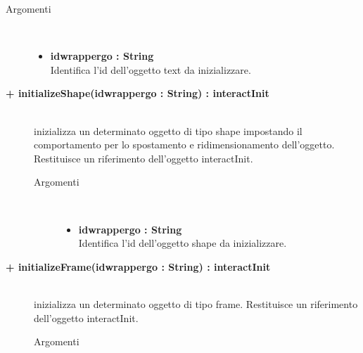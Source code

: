 \begin{description}
\begin{description}
		\begin{description}
			\item[Argomenti] \hfill \\
				\begin{itemize}
				
					\item \textbf{idwrappergo : String			} \hfill \\
						Identifica l'id dell'oggetto text da inizializzare.
					
				\end{itemize}
		\end{description}
	\end{description}	
	
\begin{description}
		\item[\textbf{\color{blue}+ initializeShape(idwrappergo : String) : interactInit			}] \hfill \\
			inizializza un determinato oggetto di tipo shape impostando il comportamento per lo spostamento e ridimensionamento dell'oggetto. Restituisce un riferimento dell'oggetto interactInit.
			
		\begin{description}
			\item[Argomenti] \hfill \\
				\begin{itemize}
				
					\item \textbf{idwrappergo : String			} \hfill \\
						Identifica l'id dell'oggetto shape da inizializzare.
					
				\end{itemize}
		\end{description}
	\end{description}	

\begin{description}
		\item[\textbf{\color{blue}+ initializeFrame(idwrappergo : String) : interactInit			}] \hfill \\
			inizializza un determinato oggetto di tipo frame. Restituisce un riferimento dell'oggetto interactInit.
			
		\begin{description}
			\item[Argomenti] \hfill \\
				\begin{itemize}
				

\end{itemize}
\end{description}
\end{description}
\end{description}
